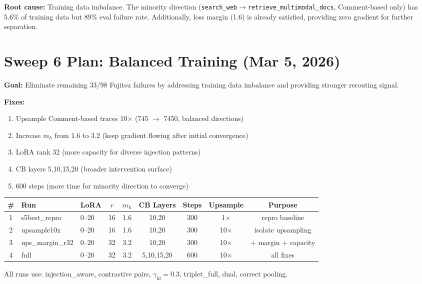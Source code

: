 \documentclass[11pt]{article}
\begin{document}
\textbf{Root cause:} Training data imbalance. The minority direction
(\texttt{search\_web}$\to$\texttt{retrieve\_multimodal\_docs}, Comment-based only)
has 5.6\% of training data but 89\% eval failure rate. Additionally,
loss margin (1.6) is already satisfied, providing zero gradient for further separation.

\section{Sweep 6 Plan: Balanced Training (Mar 5, 2026)}

\textbf{Goal:} Eliminate remaining 33/98 Fujitsu failures by addressing training data imbalance
and providing stronger rerouting signal.

\textbf{Fixes:}
\begin{enumerate}
  \item Upsample Comment-based traces 10$\times$ (745 $\to$ 7450, balanced directions)
  \item Increase $m_h$ from 1.6 to 3.2 (keep gradient flowing after initial convergence)
  \item LoRA rank 32 (more capacity for diverse injection patterns)
  \item CB layers 5,10,15,20 (broader intervention surface)
  \item 600 steps (more time for minority direction to converge)
\end{enumerate}

\begin{tabular}{cllcccccc}
\toprule
\# & Run & LoRA & $r$ & $m_h$ & CB Layers & Steps & Upsample & Purpose \\
\midrule
1 & s5best\_repro & 0--20 & 16 & 1.6 & 10,20 & 300 & 1$\times$ & repro baseline \\
2 & upsample10x & 0--20 & 16 & 1.6 & 10,20 & 300 & 10$\times$ & isolate upsampling \\
3 & ups\_margin\_r32 & 0--20 & 32 & 3.2 & 10,20 & 300 & 10$\times$ & + margin + capacity \\
4 & full & 0--20 & 32 & 3.2 & 5,10,15,20 & 600 & 10$\times$ & all fixes \\
\bottomrule
\end{tabular}

All runs use: injection\_aware, contrastive pairs, $\gamma_\mathrm{kl}=0.3$, triplet\_full, dual, correct pooling.
\end{document}
